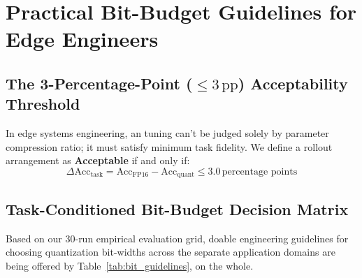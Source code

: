 \documentclass[12pt,a4paper,oneside]{report}
\begin{document}
    \chapter{Practical Bit-Budget Guidelines for Edge Engineers}

    \section{The 3-Percentage-Point ($\le 3\,\text{pp}$) Acceptability Threshold}
    In edge systems engineering, an tuning can't be judged solely by parameter compression ratio; it must satisfy minimum task fidelity. We define a rollout arrangement as \textbf{Acceptable} if and only if:
    \begin{equation}
        \Delta\text{Acc}_{\text{task}} = \text{Acc}_{\text{FP16}} - \text{Acc}_{\text{quant}} \le 3.0\,\text{percentage points}
    \end{equation}

    \section{Task-Conditioned Bit-Budget Decision Matrix}
    Based on our 30-run empirical evaluation grid, doable engineering guidelines for choosing quantization bit-widths across the separate application domains are being offered by Table~\ref{tab:bit_guidelines}, on the whole.

    \begin{table}[h!]
    \centering
    \caption{Task-Conditioned Bit-Budget Decision Matrix for Edge Computing}
    \label{tab:bit_guidelines}
    \renewcommand{\arraystretch}{1.2}
    \end{table}
\end{document}
